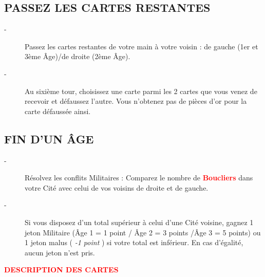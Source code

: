 \documentclass{scrartcl}%
\begin{document}
%
\subsection{ PASSEZ LES CARTES RESTANTES
}%
\label{subsec:PASSEZLESCARTESRESTANTES}%
\begin{description}%
\item[{-} ]%
%
 Passez les cartes restantes de votre main à votre voisin : de gauche (1er et 3ème Âge)/de droite (2ème Âge).
%
\item[{-} ]%
%
 Au sixième tour, choisissez une carte parmi les 2 cartes que vous venez de recevoir et défaussez l'autre. Vous n'obtenez pas de pièces d'or pour la carte défaussée ainsi.
%
\end{description}

%
\subsection{ FIN D’UN ÂGE
}%
\label{subsec:FINDUNGE}%
\begin{description}%
\item[{-} ]%
%
 Résolvez les conflits Militaires : Comparez le nombre de %
\textcolor{red}{%
\textbf{Boucliers}%
}%
\textit{ }%
 dans votre Cité avec celui de vos voisins de droite et de gauche.
%
\item[{-} ]%
%
 Si vous disposez d’un total supérieur à celui d’une Cité voisine, gagnez 1 jeton Militaire (Âge 1 = 1 point / Âge 2 = 3 points /Âge 3 = 5 points) ou 1 jeton malus (%
\textit{{-}1 point}%
) si votre total est inférieur. En cas d'égalité, aucun jeton n’est pris.
%
\end{description}%
\textcolor{red}{%
\textbf{DESCRIPTION DES CARTES}%
}%
\end{document}
